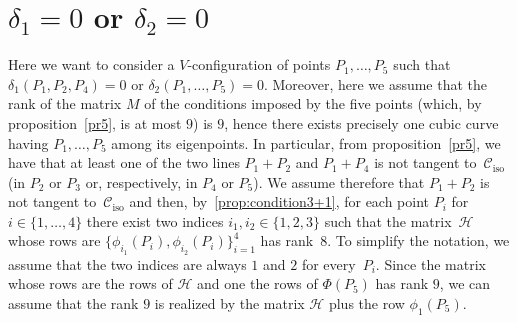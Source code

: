 \documentclass[11pt, a4paper, reqno, captions=tableheading,bibliography=totoc]{scrartcl}
\theoremstyle{plain}
\theoremstyle{definition}
\newcommand{\iso}{\mathcal{C}_{\mathrm{iso}}}
\begin{document}
\section{$\delta_1=0$ or $\delta_2=0$}

Here we want to consider a $V$-configuration of points $P_1, \dots, P_5$
such that $\delta_1(P_1, P_2, P_4) = 0$ or $\delta_2(P_1, \dots, P_5) = 0$.
Moreover, here we assume that the rank of the matrix $M$
of the conditions imposed by
the five points (which, by proposition~\ref{pr5}, is at most $9$)
is $9$, hence there exists precisely one cubic curve having
$P_1, \dots, P_5$ among its eigenpoints. In particular, from
proposition~\ref{pr5}, we have that at least one of the two lines
$P_1+P_2$ and $P_1+P_4$ is not tangent to~$\iso$ (in $P_2$
or $P_3$ or, respectively, in $P_4$ or $P_5$). We assume therefore that
$P_1+P_2$ is not tangent to~$\iso$ and then,
by~\ref{prop:condition3+1}, for each point $P_i$ for $i \in
\{1,\dotsc,4\}$ there exist
two indices $i_1, i_2 \in \{1,2,3\}$ such that the matrix~$\mathcal{H}$
whose rows are $\{ \phi_{i_1}(P_i), \phi_{i_2}(P_i)\}_{i=1}^4$ has rank~$8$.
To simplify the notation, we assume that the two indices are always $1$ and
$2$ for every~$P_i$.
Since the matrix whose rows are the rows of
$\mathcal{H}$ and one the rows of $\Phi(P_5)$ has rank $9$, we
can assume that the rank $9$ is realized by the matrix $\mathcal{H}$ plus
the row $\phi_1(P_5)$.
\end{document}
